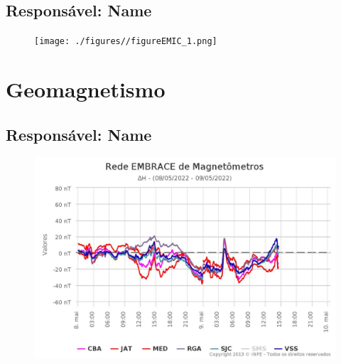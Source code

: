 \documentclass[a4paper, 10pt]{article}
\begin{document}
 \subsection{Responsável: Name} 
 
\begin{figure}[H]
    
                        \centering
   
                             \texttt{[image: ./figures//figureEMIC\_1.png]}

                        \end{figure}

                     \section{Geomagnetismo} 
 \subsection{Responsável: Name} 
 
\begin{figure}[H]
    
                        \centering
   
                             \includegraphics[width=14cm]{./figures//figureGeomag_0.png}

                        \end{figure}
\end{document}
